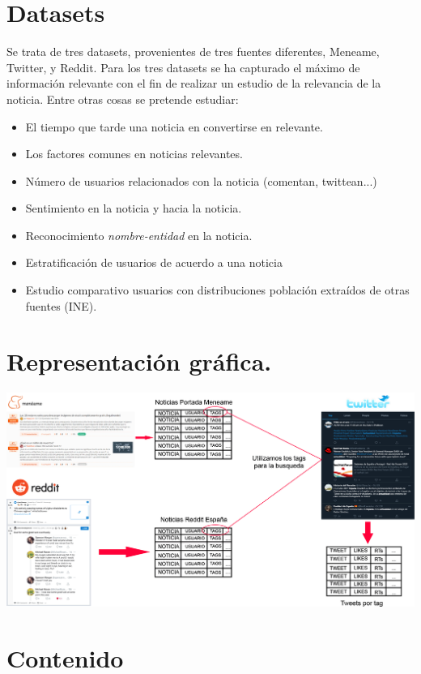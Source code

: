\documentclass[a4paper,12pt]{article}
\begin{document}
\section[item_dataset]{Datasets}

Se trata de tres datasets, provenientes de tres fuentes diferentes, Meneame, Twitter, y Reddit. Para los tres datasets se ha capturado el m\'aximo de informaci\'on relevante con el fin de realizar un estudio de la relevancia de la noticia. Entre otras cosas se pretende estudiar:

\begin{itemize}

\item El tiempo que tarde una noticia en convertirse en relevante.
\item Los factores comunes en noticias relevantes.
\item N\'umero de usuarios relacionados con la noticia (comentan, twittean...)
\item Sentimiento en la noticia y hacia la noticia.
\item Reconocimiento {\itshape nombre-entidad} en la noticia.
\item Estratificaci\'on de usuarios de acuerdo a una noticia
\item Estudio comparativo usuarios con distribuciones poblaci\'on extra\'idos de otras fuentes (INE).  
\end{itemize}


\section[item_grafico]{Representaci\'on  gr\'afica. }

\includegraphics[scale = 0.25]{esquema.png}

\section[item_contenido]{Contenido}
\end{document}
